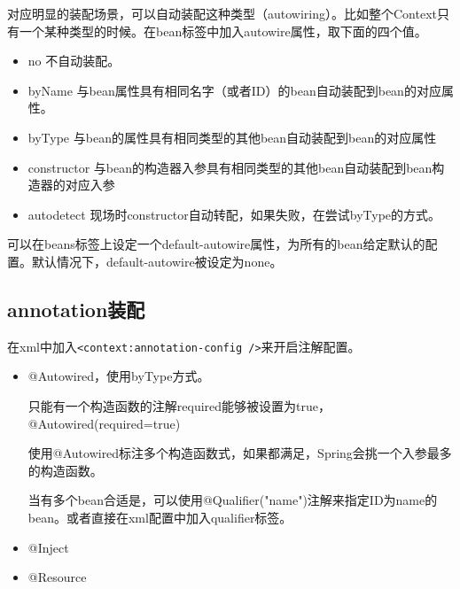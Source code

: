 对应明显的装配场景，可以自动装配这种类型（autowiring）。比如整个Context只有一个某种类型的时候。在bean标签中加入autowire属性，取下面的四个值。

\begin{itemize}
\item no 不自动装配。
\item byName 与bean属性具有相同名字（或者ID）的bean自动装配到bean的对应属性。
\item byType 与bean的属性具有相同类型的其他bean自动装配到bean的对应属性
\item constructor 与bean的构造器入参具有相同类型的其他bean自动装配到bean构造器的对应入参
\item autodetect 现场时constructor自动转配，如果失败，在尝试byType的方式。
\end{itemize}

可以在beans标签上设定一个default-autowire属性，为所有的bean给定默认的配置。默认情况下，default-autowire被设定为none。


\subsection{annotation装配}

在xml中加入\lstinline$<context:annotation-config />$来开启注解配置。

\begin{itemize}
\item @Autowired，使用byType方式。

只能有一个构造函数的注解required能够被设置为true，@Autowired(required=true)

使用@Autowired标注多个构造函数式，如果都满足，Spring会挑一个入参最多的构造函数。

当有多个bean合适是，可以使用@Qualifier("name")注解来指定ID为name的bean。或者直接在xml配置中加入qualifier标签。


\item @Inject
\item @Resource
\end{itemize}



